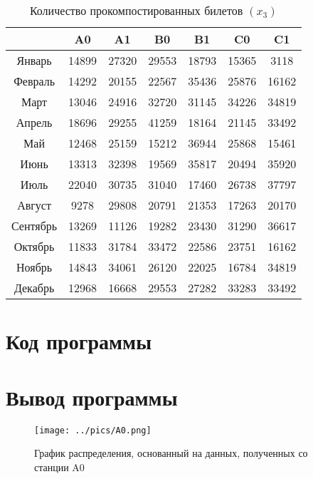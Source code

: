         \begin{table}[h!]%
        \centering
            \begin{tabular}{|c|c|c|c|c|c|c|} \hline
                    &   A0  &   A1  &   B0  &   B1  &   C0  &  C1   \\ \hline
            Январь  & 14899 & 27320 & 29553 & 18793 & 15365 & 3118  \\ \hline
            Февраль & 14292 & 20155 & 22567 & 35436 & 25876 & 16162 \\ \hline
            Март    & 13046 & 24916 & 32720 & 31145 & 34226 & 34819 \\ \hline
            Апрель  & 18696 & 29255 & 41259 & 18164 & 21145 & 33492 \\ \hline
            Май     & 12468 & 25159 & 15212 & 36944 & 25868 & 15461 \\ \hline
            Июнь    & 13313 & 32398 & 19569 & 35817 & 20494 & 35920 \\ \hline
            Июль    & 22040 & 30735 & 31040 & 17460 & 26738 & 37797 \\ \hline
            Август  & 9278  & 29808 & 20791 & 21353 & 17263 & 20170 \\ \hline
            Сентябрь& 13269 & 11126 & 19282 & 23430 & 31290 & 36617 \\ \hline
            Октябрь & 11833 & 31784 & 33472 & 22586 & 23751 & 16162 \\ \hline
            Ноябрь  & 14843 & 34061 & 26120 & 22025 & 16784 & 34819 \\ \hline
            Декабрь & 12968 & 16668 & 29553 & 27282 & 33283 & 33492 \\ \hline
            \end{tabular}
        \caption{Количество прокомпостированных билетов $(x_3)$}
        \end{table}

\section{Код программы}
    

\section{Вывод программы}
    

    \begin{figure}[ht!]
        \centering
        \texttt{[image: ../pics/A0.png]}
        \caption{График распределения, основанный на данных, полученных со станции A0}
    \end{figure}

